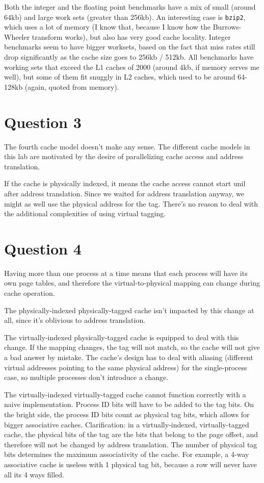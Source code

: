 Both the integer and the floating point benchmarks have a mix of small
(around 64kb) and large work sets (greater than 256kb). An interesting case is
\texttt{bzip2}, which uses a lot of memory (I know that, because I know how the
Burrows-Wheeler transform works), but also has very good cache locality.
Integer benchmarks seem to have bigger worksets, based on the fact that miss
rates still drop significantly as the cache size goes to 256kb / 512kb. All
benchmarks have working sets that exceed the L1 caches of 2000 (around 4kb, if
memory serves me well), but some of them fit snuggly in L2 caches, which used
to be around 64-128kb (again, quoted from memory).

\section{Question 3}
The fourth cache model doesn't make any sense. The different cache models in
this lab are motivated by the desire of parallelizing cache access and address
translation.

If the cache is physically indexed, it means the cache access cannot start unil
after address translation. Since we waited for address translation anyway, we
might as well use the physical address for the tag. There's no reason to deal
with the additional complexities of using virtual tagging.

\section{Question 4}
Having more than one process at a time means that each process will have its
own page tables, and therefore the virtual-to-physical mapping can change
during cache operation.

The physically-indexed physically-tagged cache isn't impacted by this change at
all, since it's oblivious to address translation.

The virtually-indexed physically-tagged cache is equipped to deal with this
change. If the mapping changes, the tag will not match, so the cache will not
give a bad answer by mistake. The cache's design has to deal with aliasing
(different virtual addresses pointing to the same physical address) for the
single-process case, so multiple processes don't introduce a change.

The virtually-indexed virtually-tagged cache cannot function correctly with a
naive implementation. Process ID bits will have to be added to the tag bits. On
the bright side, the process ID bits count as physical tag bits, which allows
for bigger associative caches. Clarification: in a virtually-indexed,
virtually-tagged cache, the physical bits of the tag are the bits that belong
to the page offset, and therefore will not be changed by address translation.
The number of physical tag bits determines the maximum associativity of the
cache. For example, a 4-way associative cache is useless with 1 physical tag
bit, because a row will never have all its 4 ways filled.

